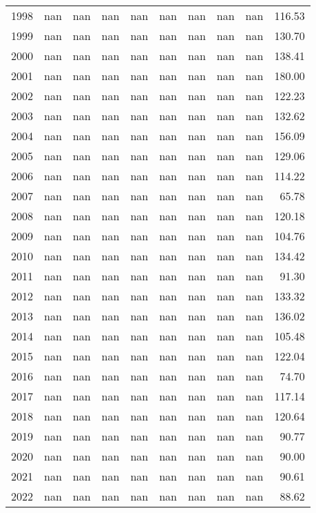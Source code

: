 \begin{tabular}{lrrrrrrrrr}
1998 & nan & nan & nan & nan & nan & nan & nan & nan & 116.53 \\
1999 & nan & nan & nan & nan & nan & nan & nan & nan & 130.70 \\
2000 & nan & nan & nan & nan & nan & nan & nan & nan & 138.41 \\
2001 & nan & nan & nan & nan & nan & nan & nan & nan & 180.00 \\
2002 & nan & nan & nan & nan & nan & nan & nan & nan & 122.23 \\
2003 & nan & nan & nan & nan & nan & nan & nan & nan & 132.62 \\
2004 & nan & nan & nan & nan & nan & nan & nan & nan & 156.09 \\
2005 & nan & nan & nan & nan & nan & nan & nan & nan & 129.06 \\
2006 & nan & nan & nan & nan & nan & nan & nan & nan & 114.22 \\
2007 & nan & nan & nan & nan & nan & nan & nan & nan & 65.78 \\
2008 & nan & nan & nan & nan & nan & nan & nan & nan & 120.18 \\
2009 & nan & nan & nan & nan & nan & nan & nan & nan & 104.76 \\
2010 & nan & nan & nan & nan & nan & nan & nan & nan & 134.42 \\
2011 & nan & nan & nan & nan & nan & nan & nan & nan & 91.30 \\
2012 & nan & nan & nan & nan & nan & nan & nan & nan & 133.32 \\
2013 & nan & nan & nan & nan & nan & nan & nan & nan & 136.02 \\
2014 & nan & nan & nan & nan & nan & nan & nan & nan & 105.48 \\
2015 & nan & nan & nan & nan & nan & nan & nan & nan & 122.04 \\
2016 & nan & nan & nan & nan & nan & nan & nan & nan & 74.70 \\
2017 & nan & nan & nan & nan & nan & nan & nan & nan & 117.14 \\
2018 & nan & nan & nan & nan & nan & nan & nan & nan & 120.64 \\
2019 & nan & nan & nan & nan & nan & nan & nan & nan & 90.77 \\
2020 & nan & nan & nan & nan & nan & nan & nan & nan & 90.00 \\
2021 & nan & nan & nan & nan & nan & nan & nan & nan & 90.61 \\
2022 & nan & nan & nan & nan & nan & nan & nan & nan & 88.62 \\

\end{tabular}
